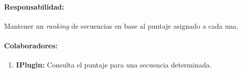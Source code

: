    \paragraph{Responsabilidad:} Mantener un \textit{ranking} de secuencias en
base al puntaje asignado a cada una.       
    \paragraph{Colaboradores:}
      \begin{enumerate}
       \item \textbf{IPlugin:} Consulta el puntaje para una secuencia
determinada.
      \end{enumerate}

